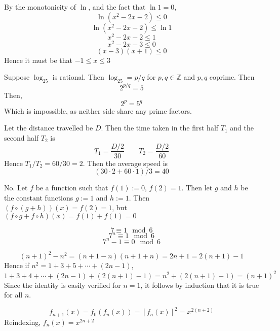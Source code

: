 \documentclass{article}
\begin{document}
\begin{Answer}
    By the monotonicity of $\ln$, and the fact that $\ln1 = 0$,
    \[\ln(x^2 - 2x - 2) \leq 0\]
    \[\ln(x^2 - 2x - 2) \leq \ln 1\]
    \[x^2 - 2x - 2 \leq 1\]
    \[x^2 - 2x - 3 \leq 0\]
    \[(x-3)(x+1) \leq 0\]
    Hence it must be that $-1 \leq x \leq 3$
\end{Answer}

\begin{Answer}
    Suppose $\log_25$ is rational. Then $\log_25 = p/q$ for $p, q \in \mathbb{Z}$ and $p, q$ coprime. Then
    \[2^{p/q} = 5\]
    Then,
    \[2^p = 5^q\]
    Which is impossible, as neither side share any prime factors.
\end{Answer}

\begin{Answer}
    Let the distance travelled be $D$. Then the time taken in the first half $T_1$ and the second half $T_2$ is 
    \[T_1 = \frac{D/2}{30} \qquad T_2 = \frac{D/2}{60}\]
    Hence $T_1/T_2 = 60/30 = 2$. Then the average speed is
    \[(30\cdot 2 + 60 \cdot 1)/3 = 40\]
\end{Answer}

\begin{Answer}
    No. Let $f$ be a function such that $f(1) := 0$, $f(2) = 1$. Then let $g$ and $h$ be the constant functions $g := 1$ and $h := 1$. Then $(f \circ (g+h))(x) = f(2) = 1$, but $(f \circ g + f \circ h)(x) = f(1) + f(1) = 0$
\end{Answer}

\begin{Answer}
    \[7 \equiv 1 \mod 6\]
    \[7^n \equiv 1 \mod 6\]
    \[7^n - 1 \equiv 0 \mod 6\]
\end{Answer}

\begin{Answer}
    \[(n+1)^2 - n^2 = (n+1 - n)(n+1 +n) = 2n+1 = 2(n+1) - 1\]
    Hence if $n^2 = 1 + 3 + 5 + \cdots + (2n-1)$, 
    \[1 + 3 + 4 + \cdots + (2n-1) + (2(n+1) - 1) = n^2 + (2(n+1) -1) = (n+1)^2\]
    Since the identity is easily verified for $n=1$, it follows by induction that it is true for all $n$.
\end{Answer}

\begin{Answer}
    \[f_{n+1}(x) = f_0(f_n(x)) = [f_n(x)]^2 = x^{2(n+2)}\]
    Reindexing, $f_n(x) = x^{2n+2}$
\end{Answer}

\begin{Answer}

\end{Answer}
\end{document}
